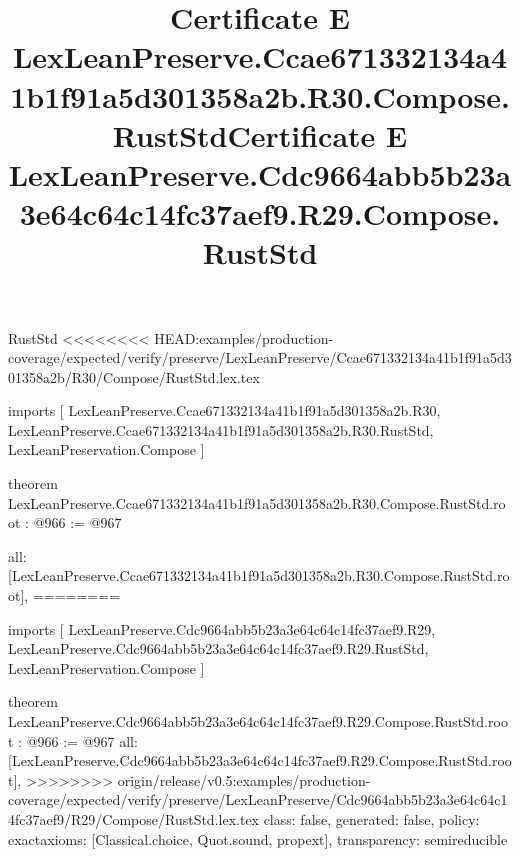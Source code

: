 \begin{lexlean}{RustStd}
<<<<<<<< HEAD:examples/production-coverage/expected/verify/preserve/LexLeanPreserve/Ccae671332134a41b1f91a5d301358a2b/R30/Compose/RustStd.lex.tex
\title{Certificate E LexLeanPreserve.Ccae671332134a41b1f91a5d301358a2b.R30.Compose.RustStd}
\begin{coremodule}
imports [
  LexLeanPreserve.Ccae671332134a41b1f91a5d301358a2b.R30,
  LexLeanPreserve.Ccae671332134a41b1f91a5d301358a2b.R30.RustStd,
  LexLeanPreservation.Compose
]

theorem LexLeanPreserve.Ccae671332134a41b1f91a5d301358a2b.R30.Compose.RustStd.root : @966 := @967 {
  all: [LexLeanPreserve.Ccae671332134a41b1f91a5d301358a2b.R30.Compose.RustStd.root],
========
\title{Certificate E LexLeanPreserve.Cdc9664abb5b23a3e64c64c14fc37aef9.R29.Compose.RustStd}
\begin{coremodule}
imports [
  LexLeanPreserve.Cdc9664abb5b23a3e64c64c14fc37aef9.R29,
  LexLeanPreserve.Cdc9664abb5b23a3e64c64c14fc37aef9.R29.RustStd,
  LexLeanPreservation.Compose
]

theorem LexLeanPreserve.Cdc9664abb5b23a3e64c64c14fc37aef9.R29.Compose.RustStd.root : @966 := @967 {
  all: [LexLeanPreserve.Cdc9664abb5b23a3e64c64c14fc37aef9.R29.Compose.RustStd.root],
>>>>>>>> origin/release/v0.5:examples/production-coverage/expected/verify/preserve/LexLeanPreserve/Cdc9664abb5b23a3e64c64c14fc37aef9/R29/Compose/RustStd.lex.tex
  class: false,
  generated: false,
  policy: exact{axioms: [Classical.choice, Quot.sound, propext]},
  transparency: semireducible
}


\end{coremodule}}
\end{coremodule}
\end{lexlean}
